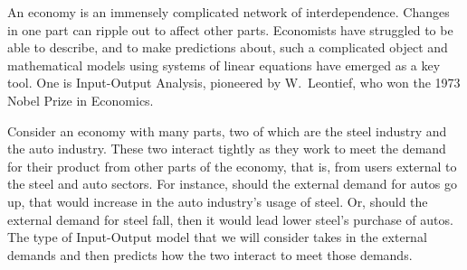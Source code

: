 An economy is an immensely complicated network of interdependence.
Changes in one part can ripple out to affect other parts.
Economists have struggled to be able to describe, and to make
predictions about, such a complicated object and 
mathematical models using systems of linear equations
have emerged as a key tool.
One is Input-Output Analysis, pioneered by 
W.~Leontief, 
who won the 1973 Nobel Prize in Economics.

Consider an economy with many parts, two of which are the steel industry and
the auto industry.
These two interact tightly
as they work to meet the demand for their product
from other parts of the economy, that is, from users external to the steel and
auto sectors.
For instance, should the external demand for autos go up, that would 
increase in the auto industry's usage of steel.
Or, should the external demand for steel fall, then it would lead lower
steel's purchase of autos.
The type of Input-Output model that
we will consider takes in the external demands
and then predicts how the two interact to meet those demands.

